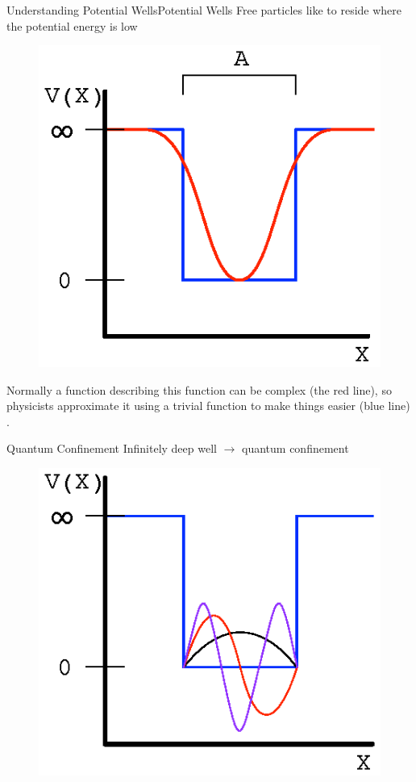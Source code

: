 \documentclass{beamer}
\begin{document}
\begin{frame}[fragile]{Understanding Potential Wells}{Potential Wells}
   Free particles like to reside where the potential energy is low

\begin{figure}[h]
  \centering
  \includegraphics[scale=0.7]{figures/realWell.eps}
\end{figure}
  Normally a function describing this function can be complex (the red line), so physicists
  approximate it using a trivial function to make things easier (blue line) \cite{dots}.
\end{frame}

\begin{frame}[fragile]{Quantum Confinement}{}
  Infinitely deep well $\rightarrow$ quantum confinement 

\begin{figure}[h]
 \centering
 \includegraphics[scale=.7]{figures/confined.eps}
\end{figure}
\end{frame}
\end{document}
